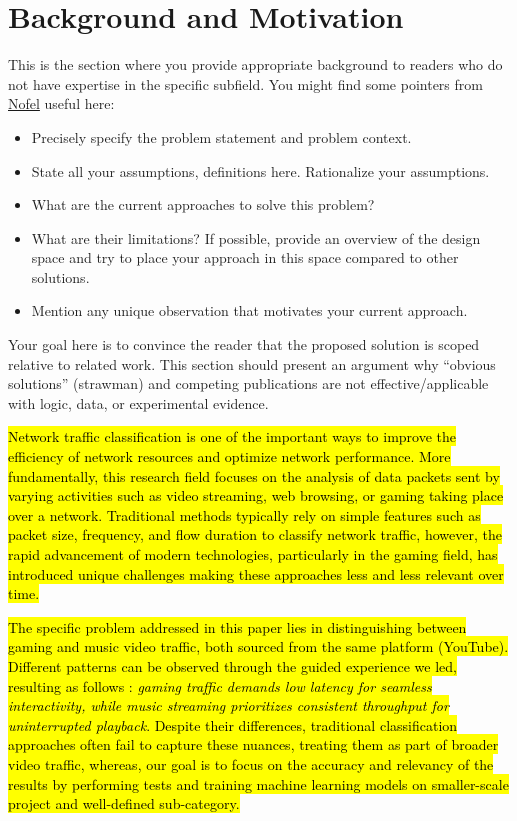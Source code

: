 \section{Background and Motivation}
\label{sec:background}

This is the section where you provide appropriate background to readers who do not have expertise in the specific subfield. You might find some pointers from \href{https://www.seas.upenn.edu/~nyaseen/PaperWriting2.pdf}{Nofel} useful here: 
\begin{itemize}
    \item Precisely specify the problem statement and problem context. 
    \item State all your assumptions, definitions here. Rationalize your assumptions. 
    \item What are the current approaches to solve this problem? 
    \item What are their limitations? If possible, provide an overview of the design space and try to place your approach in this space compared to other solutions. 
    \item Mention any unique observation that motivates your current approach. 
\end{itemize}

Your goal here is to convince the reader that the proposed solution is scoped relative to related work. This section should present an argument why “obvious solutions” (strawman) and competing publications are not effective/applicable with logic, data, or experimental evidence.

\hl{Network traffic classification is one of the important ways to improve the efficiency of network resources and optimize network performance. More fundamentally, this research field focuses on the analysis of data packets sent by varying activities such as video streaming, web browsing, or gaming taking place over a network. Traditional methods typically rely on simple features such as packet size, frequency, and flow duration to classify network traffic, however, the rapid advancement of modern technologies, particularly in the gaming field, has introduced unique challenges making these approaches less and less relevant over time.}

\vspace{2mm}

\hl{The specific problem addressed in this paper lies in distinguishing between gaming and music video traffic, both sourced from the same platform (YouTube). Different patterns can be observed through the guided experience we led, resulting as follows : \textit{gaming traffic demands low latency for seamless interactivity, while music streaming prioritizes consistent throughput for uninterrupted playback}. Despite their differences, traditional classification approaches often fail to capture these nuances, treating them as part of broader video traffic, whereas, our goal is to focus on the accuracy and relevancy of the results by performing tests and training machine learning models on smaller-scale project and well-defined sub-category.}

